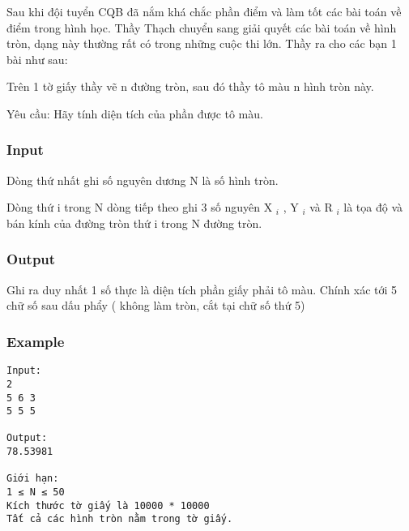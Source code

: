 



   Sau khi đội tuyển CQB đã nắm khá chắc phần điểm và làm tốt các bài toán về điểm trong hình học. Thầy Thạch chuyển sang giải quyết các bài toán về hình tròn, dạng này thường rất có trong những cuộc thi lớn. Thầy ra cho các bạn 1 bài như sau:  

   Trên 1 tờ giấy thầy vẽ n đường tròn, sau đó thầy tô màu n hình tròn này.  

   Yêu cầu: Hãy tính diện tích của phần được tô màu.  

\subsubsection{   Input  }

   Dòng thứ nhất ghi số nguyên dương N là số hình tròn.  

   Dòng thứ i trong N dòng tiếp theo ghi 3 số nguyên X   $_    i   $   , Y   $_    i   $   và R   $_    i   $   là tọa độ và bán kính của đường tròn thứ i trong N đường tròn.  

\subsubsection{   Output  }

   Ghi ra duy nhất 1 số thực là diện tích phần giấy phải tô màu. Chính xác tới 5 chữ số sau dấu phẩy ( không làm tròn, cắt tại chữ số thứ 5)  

\subsubsection{   Example  }
\begin{verbatim}
Input:
2
5 6 3
5 5 5

Output:
78.53981

Giới hạn:
1 ≤ N ≤ 50
Kích thước tờ giấy là 10000 * 10000
Tất cả các hình tròn nằm trong tờ giấy.
\end{verbatim}
